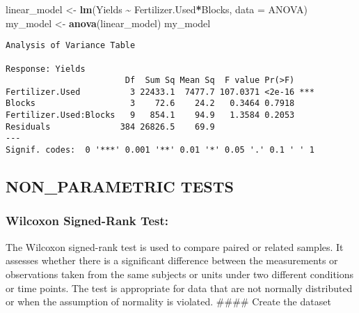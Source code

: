 \documentclass[
]{article}
\newenvironment{Shaded}{\begin{snugshade}}{\end{snugshade}}
\newcommand{\AttributeTok}[1]{\textcolor[rgb]{0.13,0.29,0.53}{#1}}
\newcommand{\FunctionTok}[1]{\textcolor[rgb]{0.13,0.29,0.53}{\textbf{#1}}}
\newcommand{\NormalTok}[1]{#1}
\newcommand{\OtherTok}[1]{\textcolor[rgb]{0.56,0.35,0.01}{#1}}
\newcommand{\SpecialCharTok}[1]{\textcolor[rgb]{0.81,0.36,0.00}{\textbf{#1}}}
\begin{document}
\begin{Shaded}
\begin{Highlighting}[]
\NormalTok{linear\_model }\OtherTok{\textless{}{-}} \FunctionTok{lm}\NormalTok{(Yields }\SpecialCharTok{\textasciitilde{}}\NormalTok{ Fertilizer.Used}\SpecialCharTok{*}\NormalTok{Blocks, }\AttributeTok{data =}\NormalTok{ ANOVA)}
\NormalTok{my\_model }\OtherTok{\textless{}{-}} \FunctionTok{anova}\NormalTok{(linear\_model)}
\NormalTok{my\_model}
\end{Highlighting}
\end{Shaded}

\begin{verbatim}
Analysis of Variance Table

Response: Yields
                        Df  Sum Sq Mean Sq  F value Pr(>F)    
Fertilizer.Used          3 22433.1  7477.7 107.0371 <2e-16 ***
Blocks                   3    72.6    24.2   0.3464 0.7918    
Fertilizer.Used:Blocks   9   854.1    94.9   1.3584 0.2053    
Residuals              384 26826.5    69.9                    
---
Signif. codes:  0 '***' 0.001 '**' 0.01 '*' 0.05 '.' 0.1 ' ' 1
\end{verbatim}

\hypertarget{non_parametric-tests}{%
\subsection{NON\_PARAMETRIC TESTS}\label{non_parametric-tests}}

\hypertarget{wilcoxon-signed-rank-test}{%
\subsubsection{Wilcoxon Signed-Rank
Test:}\label{wilcoxon-signed-rank-test}}

The Wilcoxon signed-rank test is used to compare paired or related
samples. It assesses whether there is a significant difference between
the measurements or observations taken from the same subjects or units
under two different conditions or time points. The test is appropriate
for data that are not normally distributed or when the assumption of
normality is violated. \#\#\#\# Create the dataset
\end{document}
